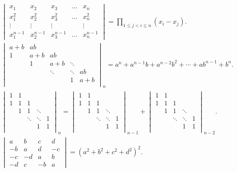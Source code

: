 \begin{gather*}
\begin{vmatrix}
		x_1 & x_2 & x_3 & \dots & x_n \\
		x_1^2 & x_2^2 & x_3^2 & \dots & x_n^2 \\
		\vdots & \vdots & \vdots& & \vdots \\
		x_1^{n-1} & x_2^{n-1} & x_3^{n-1} & \dots & x_n^{n-1}
	\end{vmatrix}
	= \prod_{1 \leq j < i \leq n}(x_i-x_j). \\
	\begin{vmatrix}
		a+b & ab & \\
		1 & a+b & ab & \\
		& 1 & a + b & \ddots & \\
		& & \ddots & \ddots & ab \\
		& & & 1 & a+b \\
	\end{vmatrix}_n
	= a^n + a^{n-1} b + a^{n-2} b^2 + \dotsb + a b^{n-1} + b^n. \\
	\begin{vmatrix}
		1 & 1 & \\
		1 & 1 & 1 & \\
		& 1 & 1 & \ddots & \\
		& & \ddots & \ddots & 1 \\
		& & & 1 & 1 \\
	\end{vmatrix}_n
	= \begin{vmatrix}
		1 & 1 & \\
		1 & 1 & 1 & \\
		& 1 & 1 & \ddots & \\
		& & \ddots & \ddots & 1 \\
		& & & 1 & 1 \\
	\end{vmatrix}_{n-1}
	+ \begin{vmatrix}
		1 & 1 & \\
		1 & 1 & 1 & \\
		& 1 & 1 & \ddots & \\
		& & \ddots & \ddots & 1 \\
		& & & 1 & 1 \\
	\end{vmatrix}_{n-2}. \\
	\begin{vmatrix}
		a & b & c & d \\
		-b & a & d & -c \\
		-c & -d & a & b \\
		-d & c & -b & a
	\end{vmatrix}
	= (a^2+b^2+c^2+d^2)^2.
\end{gather*}

